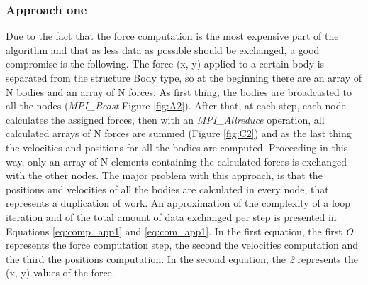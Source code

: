 \documentclass[a4paper]{article}
\begin{document}
\subsubsection{Approach one}
\label{sec:app_1}
Due to the fact that the force computation is the most expensive part of the algorithm and that as less data as possible should be exchanged, a good compromise is the following. The force (x, y) applied to a certain body is separated from the structure Body type, so at the beginning there are an array of N bodies and an array of N forces. As first thing, the bodies are broadcasted to all the nodes (\textit{MPI\_Bcast} Figure \ref{fig:A2}). After that, at each step, each node calculates the assigned forces, then with an \textit{MPI\_Allreduce} operation, all calculated arrays of N forces are summed (Figure \ref{fig:C2}) and as the last thing the velocities and positions for all the bodies are computed. Proceeding in this way, only an array of N elements containing the calculated forces is exchanged with the other nodes. The major problem with this approach, is that the positions and velocities of all the bodies are calculated in every node, that represents a duplication of work. An approximation of the complexity of a loop iteration and of the total amount of data exchanged per step is presented in Equations \ref{eq:comp_app1} and \ref{eq:com_app1}. In the first equation, the first \textit{O} represents the force computation step, the second the velocities computation and the third the positions computation. In the second equation, the \textit{2} represents the (x, y) values of the force.
\end{document}
